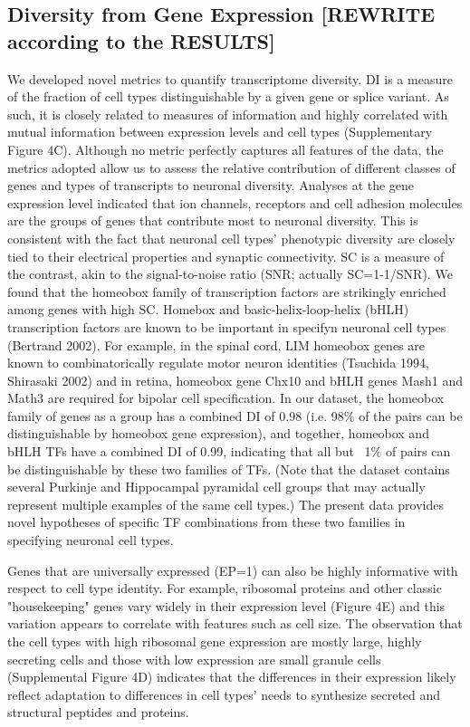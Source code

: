 \subsection{Diversity from Gene Expression [REWRITE according to the RESULTS]}
We developed novel metrics to quantify transcriptome diversity. DI is a measure of the fraction of cell types distinguishable by a given gene or splice variant. As such, it is closely related to measures of information and highly correlated with mutual information between expression levels and cell types (Supplementary Figure 4C). Although no metric perfectly captures all features of the data, the metrics adopted allow us to assess the relative contribution of different classes of genes and types of transcripts to neuronal diversity. Analyses at the gene expression level indicated that ion channels, receptors and cell adhesion molecules are the groups of genes that contribute most to neuronal diversity. This is consistent with the fact that neuronal cell types' phenotypic diversity are closely tied to their electrical properties and synaptic connectivity. SC is a measure of the contrast, akin to the signal-to-noise ratio (SNR; actually SC=1-1/SNR). We found that the homeobox family of transcription factors are strikingly enriched among genes with high SC. Homebox and basic-helix-loop-helix (bHLH) transcription factors are known to be important in specifyn neuronal cell types (Bertrand 2002). For example, in the spinal cord, LIM homeobox genes are known to combinatorically regulate motor neuron identities (Tsuchida 1994, Shirasaki 2002) and in retina, homeobox gene Chx10 and bHLH genes Mash1 and Math3 are required for bipolar cell specification. In our dataset, the homeobox family of genes as a group has a combined DI of 0.98 (i.e. 98\% of the pairs can be distinguishable by homeobox gene expression), and together, homeobox and bHLH TFs have a combined DI of 0.99, indicating that all but ~1\% of pairs can be distinguishable by these two families of TFs. (Note that the dataset contains several Purkinje and Hippocampal pyramidal cell groups that may actually represent multiple examples of the same cell types.) The present data provides novel hypotheses of specific TF combinations from these two families in specifying neuronal cell types.

Genes that are universally expressed (EP=1) can also be highly informative with respect to cell type identity. For example, ribosomal proteins and other classic "housekeeping" genes vary widely in their expression level (Figure 4E) and this variation appears to correlate with features such as cell size. The observation that the cell types with high ribosomal gene expression are mostly large, highly secreting cells and those with low expression are small granule cells (Supplemental Figure 4D) indicates that the differences in their expression likely reflect adaptation to differences in cell types' needs to synthesize secreted and structural peptides and proteins.

